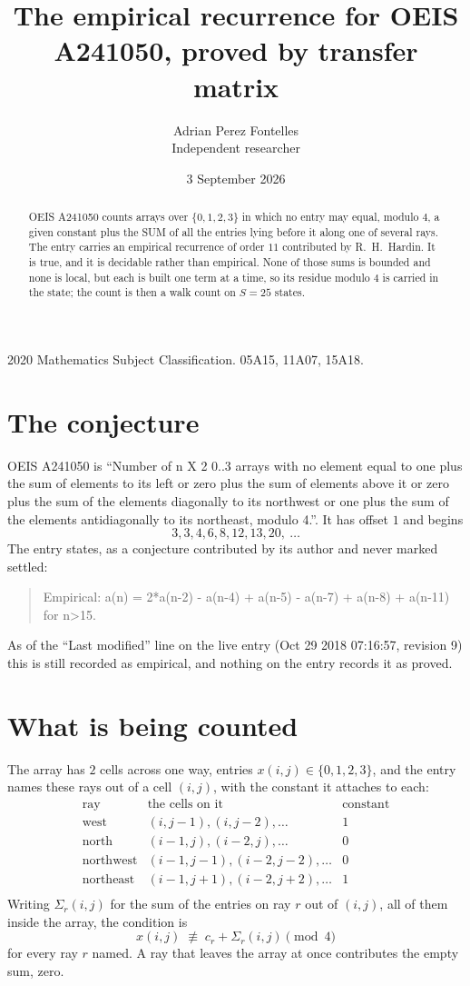\documentclass[11pt,a4paper]{article}
\title{The empirical recurrence for OEIS A241050, proved by transfer matrix}
\author{Adrian Perez Fontelles\\ \small Independent researcher}
\date{3 September 2026}
\theoremstyle{plain}
\theoremstyle{definition}
\begin{document}
\maketitle

\begin{abstract}
OEIS A241050 counts arrays over $\{0,1,2,3\}$ in which no entry may equal, modulo $4$, a given
constant plus the SUM of all the entries lying before it along one of several rays. The entry
carries an empirical recurrence of order $11$ contributed by R.~H.~Hardin. It is true, and
it is decidable rather than empirical. None of those sums is bounded and none is local, but
each is built one term at a time, so its residue modulo $4$ is carried in the state; the
count is then a walk count on $S=25$ states.
\end{abstract}

\noindent\small 2020 Mathematics Subject Classification. 05A15, 11A07, 15A18.\normalsize

\section{The conjecture}

OEIS A241050 is ``Number of n X 2 0..3 arrays with no element equal to one plus the sum of elements to its left or zero plus the sum of elements above it or zero plus the sum of the elements diagonally to its northwest or one plus the sum of the elements antidiagonally to its northeast, modulo 4.''. It has offset $1$ and begins
\[
3, 3, 4, 6, 8, 12, 13, 20,\ \dots
\]
The entry states, as a conjecture contributed by its author and never marked settled:
\begin{quote}
Empirical: a(n) = 2*a(n-2) - a(n-4) + a(n-5) - a(n-7) + a(n-8) + a(n-11) for n>15.
\end{quote}
As of the ``Last modified'' line on the live entry (Oct 29 2018 07:16:57, revision 9) this is still
recorded as empirical, and nothing on the entry records it as proved.

\section{What is being counted}

The array has $2$ cells across one way, entries $x(i,j)\in\{0,1,2,3\}$, and the entry names these
rays out of a cell $(i,j)$, with the constant it attaches to each:
\[
\begin{array}{lll}
\text{ray} & \text{the cells on it} & \text{constant} \\[2pt]
\text{west} & (i,j-1),(i,j-2),\dots & 1 \\
\text{north} & (i-1,j),(i-2,j),\dots & 0 \\
\text{northwest} & (i-1,j-1),(i-2,j-2),\dots & 0 \\
\text{northeast} & (i-1,j+1),(i-2,j+2),\dots & 1 \\
\end{array}
\]
Writing $\Sigma_r(i,j)$ for the sum of the entries on ray $r$ out of $(i,j)$, all of them
inside the array, the condition is
\[
x(i,j)\;\not\equiv\;c_r+\Sigma_r(i,j) \pmod{4}
\]
for every ray $r$ named. A ray that leaves the array at once contributes the empty sum,
zero.
\end{document}
